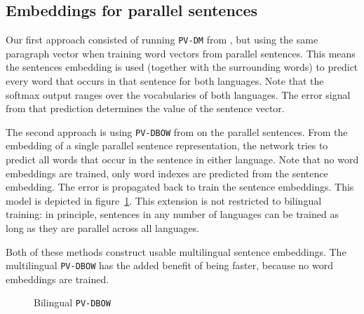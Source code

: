 \subsection{Embeddings for parallel sentences}



Our first approach consisted of running \texttt{PV-DM} from \cite{Le2014}, 
but using the same paragraph vector when training word vectors from parallel sentences. 
This means the sentences embedding is used (together with the surrounding words) to predict every word that occurs in that sentence for both languages. Note that the softmax output ranges over the vocabularies of both languages.
The error signal from that prediction determines the value of the sentence vector.



The second approach is using \texttt{PV-DBOW} from \cite{Le2014} on the parallel sentences.
From the embedding of a single parallel sentence representation, the network tries to predict all words that occur in the sentence in either language.
Note that no word embeddings are trained, only word indexes are predicted from the sentence embedding.
The error is propagated back to train the sentence embeddings.
This model is depicted in figure~\ref{f:bilingual_dbow}. This extension is not restricted to bilingual training: in principle, sentences in any number of languages can be trained as long as they are parallel across all languages.


Both of these methods construct usable multilingual sentence embeddings.
The multilingual \texttt{PV-DBOW} has the added benefit of being faster, because no word embeddings are trained.


\begin{figure}

\center

\caption{Bilingual {\tt PV-DBOW}}
\label{f:bilingual_dbow}
\end{figure}


% 

